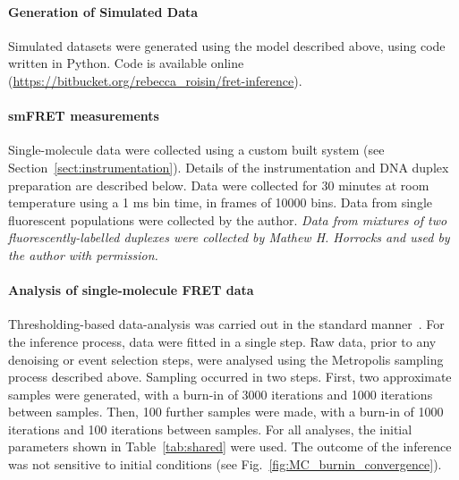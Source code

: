 \paragraph*{Generation of Simulated Data}
Simulated datasets were generated using the model described above, using code written in Python. Code is available online (\url{https://bitbucket.org/rebecca_roisin/fret-inference}). 

\paragraph*{smFRET measurements}
Single-molecule data were collected using a custom built system (see Section~\ref{sect:instrumentation}). Details of the instrumentation and DNA duplex preparation are described below. Data were collected for 30 minutes at room temperature using a 1 ms bin time, in frames of 10000 bins. Data from single fluorescent populations were collected by the author. \emph{Data from mixtures of two fluorescently-labelled duplexes were collected by Mathew H. Horrocks and used by the author with permission.}

\paragraph*{Analysis of single-molecule FRET data}
Thresholding-based data-analysis was carried out in the standard manner~\cite{deniz01}.  For the inference process, data were fitted in a single step. Raw data, prior to any denoising or event selection steps, were analysed using the Metropolis sampling process described above. Sampling occurred in two steps. First, two approximate samples were generated, with a burn-in of 3000 iterations and 1000 iterations between samples. Then, 100 further samples were made, with a burn-in of 1000 iterations and 100 iterations between samples. For all analyses, the initial parameters shown in Table~\ref{tab:shared} were used. The outcome of the inference was not sensitive to initial conditions (see Fig.~\ref{fig:MC_burnin_convergence}).  

